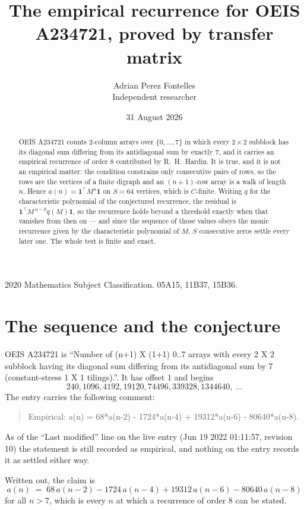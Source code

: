 \documentclass[11pt,a4paper]{article}
\title{The empirical recurrence for OEIS A234721, proved by transfer matrix}
\author{Adrian Perez Fontelles\\ \small Independent researcher}
\date{31 August 2026}
\theoremstyle{plain}
\theoremstyle{definition}
\begin{document}
\maketitle

\begin{abstract}
OEIS A234721 counts $2$-column arrays over $\{0,\dots,7\}$ in which every
$2\times2$ subblock has its diagonal sum differing from its antidiagonal sum by
exactly $7$, and it
carries an empirical recurrence of order $8$ contributed by R.~H.~Hardin. It is true,
and it is not an empirical matter: the condition constrains only consecutive pairs of rows,
so the rows are the vertices of a finite digraph and an $(n+1)$-row array is a walk of
length $n$. Hence $a(n)=\mathbf{1}^{\!\top}M^{n}\mathbf{1}$ on $S=64$ vertices, which
is $C$-finite. Writing $q$ for the characteristic polynomial of the conjectured recurrence,
the residual is $\mathbf{1}^{\!\top}M^{\,n-8}q(M)\mathbf{1}$, so the recurrence
holds beyond a threshold exactly when that vanishes from then on --- and since the sequence
of those values obeys the monic recurrence given by the characteristic polynomial of $M$,
$S$ consecutive zeros settle every later one. The whole test is finite and exact.
\end{abstract}

\noindent\small 2020 Mathematics Subject Classification. 05A15, 11B37, 15B36.\normalsize

\section{The sequence and the conjecture}

OEIS A234721 is ``Number of (n+1) X (1+1) 0..7 arrays with every 2 X 2 subblock having its diagonal sum differing from its antidiagonal sum by 7 (constant-stress 1 X 1 tilings).''. It has offset
$1$ and begins
\[
240, 1096, 4192, 19120, 74496, 339328, 1344640,\ \dots
\]
The entry carries the following comment:
\begin{quote}\small
Empirical: a(n) = 68*a(n-2) - 1724*a(n-4) + 19312*a(n-6) - 80640*a(n-8).
\end{quote}
As of the ``Last modified'' line on the live entry (Jun 19 2022 01:11:57, revision 10) the statement is
still recorded as empirical, and nothing on the entry records it as settled either way.

Written out, the claim is
\begin{equation}\label{eq:conj}
a(n)\;=\;68\,a(n-2) - 1724\,a(n-4) + 19312\,a(n-6) - 80640\,a(n-8)
\end{equation}
for all $n>7$, which is every $n$ at which a recurrence of order $8$ can be
stated.
\end{document}
